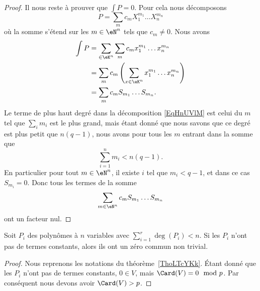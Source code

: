 \begin{proof}
    Il nous reste à prouver que \( \int P=0\). Pour cela nous décomposons
    \begin{equation}        \label{EqHnUVlM}
        P=\sum_m c_mX_1^{m_1}\ldots X_n^{m_n}
    \end{equation}
    où la somme s'étend sur les \( m\in \eN^n\) tels que \( c_m\neq 0\). Nous avons
    \begin{subequations}
        \begin{align}
            \int P&=\sum_{\in \eK^n}\sum_mc_m x_1^{m_1}\ldots x_n^{m_n}\\
            &=\sum_{m}c_m\left( \sum_{x\in \eK^n}x_1^{m_1}\ldots x_n^{m_n} \right)\\
            &=\sum_m c_m S_{m_1}\ldots S_{m_n}.
        \end{align}
    \end{subequations}
    Le terme de plus haut degré dans la décomposition \eqref{EqHnUVlM} est celui du \( m\) tel que \( \sum_im_i\) est le plus grand, mais étant donné que nous savons que ce degré est plus petit que \( n(q-1)\), nous avons pour tous les \( m\) entrant dans la somme que
    \begin{equation}
        \sum_{i=1}^nm_i<n(q-1).
    \end{equation}
    En particulier pour tout \( m\in \eN^n\), il existe \( i\) tel que \( m_i<q-1\), et dans ce cas \( S_{m_i}=0\). Donc tous les termes de la somme
    \begin{equation}
        \sum_{m\in \eN^n}c_mS_{m_1}\ldots S_{m_n}
    \end{equation}
    ont un facteur nul.
\end{proof}

\begin{corollary}       \label{CorfuHNKz}
    Soit \( P_i\) des polynômes à \( n\) variables avec \( \sum_{i=1}^r\deg(P_i)<n\). Si les \( P_i\) n'ont pas de termes constants, alors ils ont un zéro commun non trivial.
\end{corollary}

\begin{proof}
    Nous reprenons les notations du théorème~\ref{ThoLTcYKk}. Étant donné que les \( P_i\) n'ont pas de termes constants, \( 0\in V\), mais \( \Card(V)=0\mod p\). Par conséquent nous devons avoir \( \Card(V)>p\).
\end{proof}

